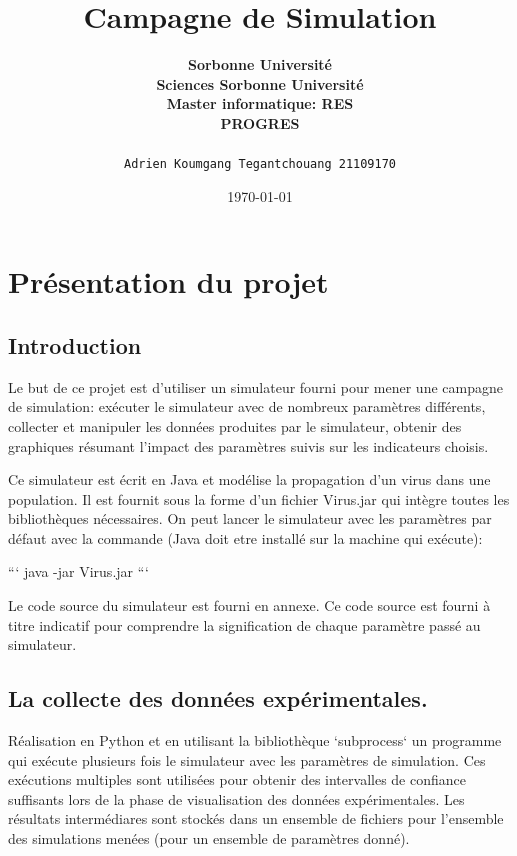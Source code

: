\documentclass[a4paper, 11pt]{article}
\title{Campagne de Simulation}
\author{\textbf{Sorbonne Université} \\
	\textbf{Sciences Sorbonne Université} \\
	\textbf{Master informatique: RES} \\
	\textbf{PROGRES} \\ \\
	\texttt{Adrien Koumgang Tegantchouang 21109170}}
\date{\today}
\begin{document}
	\maketitle
	
	\newpage
	
	\tableofcontents
	
	\newpage
	
	\section{Présentation du projet}

		\subsection{Introduction}

			Le but de ce projet est d'utiliser un simulateur fourni pour mener une campagne de simulation: exécuter le simulateur avec de nombreux paramètres différents, collecter et manipuler les données produites par le simulateur, obtenir des graphiques résumant l'impact des paramètres suivis sur les indicateurs choisis.

			Ce simulateur est écrit en Java et modélise la propagation d'un virus dans une population. Il est fournit sous la forme d'un fichier Virus.jar qui intègre toutes les bibliothèques nécessaires. On peut lancer le simulateur avec les paramètres par défaut avec la commande (Java doit etre installé sur la machine qui exécute):

			```
			java -jar Virus.jar
			```

			Le code source du simulateur est fourni en annexe. Ce code source est fourni à titre indicatif pour comprendre la signification de chaque paramètre passé au simulateur.


		\subsection{La collecte des données expérimentales.}

			Réalisation en Python et en utilisant la bibliothèque `subprocess` un programme qui exécute plusieurs fois le simulateur avec les paramètres de simulation. Ces exécutions multiples sont utilisées pour obtenir des intervalles de confiance suffisants lors de la phase de visualisation des données expérimentales. Les résultats intermédiares sont stockés dans un ensemble de fichiers pour l'ensemble des simulations menées (pour un ensemble de paramètres donné).
\end{document}
